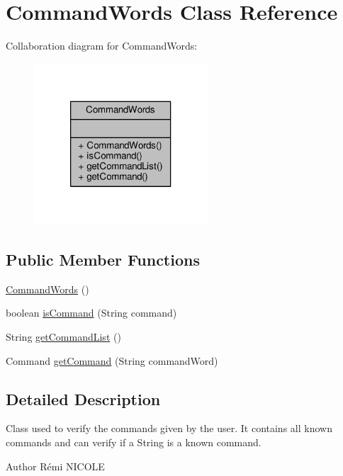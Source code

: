 \hypertarget{classCommandWords}{\section{Command\-Words Class Reference}
\label{classCommandWords}
}


Collaboration diagram for Command\-Words\-:
\nopagebreak
\begin{figure}[H]
\begin{center}
\leavevmode
\includegraphics[width=184pt]{classCommandWords__coll__graph}
\end{center}
\end{figure}
\subsection*{Public Member Functions}
\begin{DoxyCompactItemize}
\item 
\hyperlink{classCommandWords_a2d8c096723adb3f822cc001bccd92ed7}{Command\-Words} ()
\item 
boolean \hyperlink{classCommandWords_a646ed94a6d8d190b7cc445378ee2306e}{is\-Command} (String command)
\item 
String \hyperlink{classCommandWords_aa26f54985e39543739e0ae291dcdb8f1}{get\-Command\-List} ()
\item 
Command \hyperlink{classCommandWords_af89bc564e4cf32021721ca44f46de6cb}{get\-Command} (String command\-Word)
\end{DoxyCompactItemize}


\subsection{Detailed Description}
Class used to verify the commands given by the user. It contains all known commands and can verify if a String is a known command. \begin{DoxyAuthor}{Author}
Rémi N\-I\-C\-O\-L\-E 
\end{DoxyAuthor}



